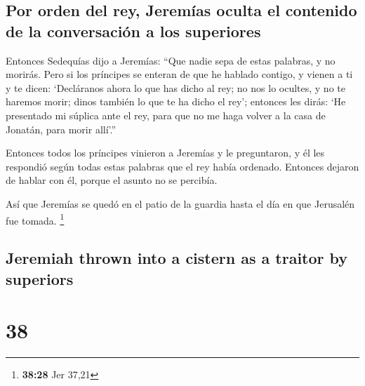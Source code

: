 \begin{paracol}{2}
\hypertarget{por-orden-del-rey-jeremuxedas-oculta-el-contenido-de-la-conversaciuxf3n-a-los-superiores}{%
\subsection{Por orden del rey, Jeremías oculta el contenido de la
conversación a los
superiores}\label{por-orden-del-rey-jeremuxedas-oculta-el-contenido-de-la-conversaciuxf3n-a-los-superiores}}

 Entonces Sedequías dijo a Jeremías: ``Que nadie sepa de
estas palabras, y no morirás.  Pero si los príncipes se
enteran de que he hablado contigo, y vienen a ti y te dicen: `Decláranos
ahora lo que has dicho al rey; no nos lo ocultes, y no te haremos morir;
dinos también lo que te ha dicho el rey';  entonces les
dirás: `He presentado mi súplica ante el rey, para que no me haga volver
a la casa de Jonatán, para morir allí'.''

 Entonces todos los príncipes vinieron a Jeremías y le
preguntaron, y él les respondió según todas estas palabras que el rey
había ordenado. Entonces dejaron de hablar con él, porque el asunto no
se percibía.

 Así que Jeremías se quedó en el patio de la guardia
hasta el día en que Jerusalén fue tomada. \footnote{\textbf{38:28} Jer
  37,21}

\switchcolumn
\begin{otherlanguage}{english}

\hypertarget{jeremiah-thrown-into-a-cistern-as-a-traitor-by-superiors}{%
\subsection{Jeremiah thrown into a cistern as a traitor by
superiors}\label{jeremiah-thrown-into-a-cistern-as-a-traitor-by-superiors}}

\hypertarget{section-75}{%
\section{38}\label{section-75}}


\end{otherlanguage}
\end{paracol}
